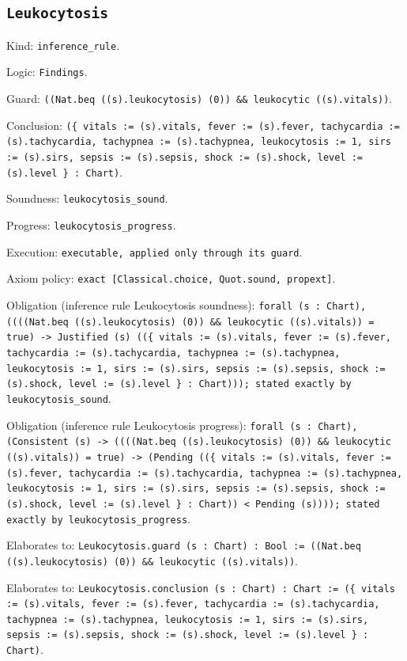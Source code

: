 \documentclass[11pt]{article}
\begin{document}
\subsection*{\texttt{Leukocytosis}}
\noindent Kind: \texttt{inference_rule}.\par
\noindent Logic: \texttt{Findings}.\par
\noindent Guard: \texttt{((Nat.beq ((s).leukocytosis) (0)) \&\& leukocytic ((s).vitals))}.\par
\noindent Conclusion: \texttt{(\{ vitals := (s).vitals, fever := (s).fever, tachycardia := (s).tachycardia, tachypnea := (s).tachypnea, leukocytosis := 1, sirs := (s).sirs, sepsis := (s).sepsis, shock := (s).shock, level := (s).level \} : Chart)}.\par
\noindent Soundness: \texttt{leukocytosis\_sound}.\par
\noindent Progress: \texttt{leukocytosis\_progress}.\par
\noindent Execution: \texttt{executable, applied only through its guard}.\par
\noindent Axiom policy: \texttt{exact [Classical.choice, Quot.sound, propext]}.\par
\noindent Obligation (inference rule Leukocytosis soundness): \texttt{forall (s : Chart), ((((Nat.beq ((s).leukocytosis) (0)) \&\& leukocytic ((s).vitals)) = true) -> Justified (s) ((\{ vitals := (s).vitals, fever := (s).fever, tachycardia := (s).tachycardia, tachypnea := (s).tachypnea, leukocytosis := 1, sirs := (s).sirs, sepsis := (s).sepsis, shock := (s).shock, level := (s).level \} : Chart))); stated exactly by leukocytosis\_sound}.\par
\noindent Obligation (inference rule Leukocytosis progress): \texttt{forall (s : Chart), (Consistent (s) -> ((((Nat.beq ((s).leukocytosis) (0)) \&\& leukocytic ((s).vitals)) = true) -> (Pending ((\{ vitals := (s).vitals, fever := (s).fever, tachycardia := (s).tachycardia, tachypnea := (s).tachypnea, leukocytosis := 1, sirs := (s).sirs, sepsis := (s).sepsis, shock := (s).shock, level := (s).level \} : Chart)) < Pending (s)))); stated exactly by leukocytosis\_progress}.\par
\noindent Elaborates to: \texttt{Leukocytosis.guard (s : Chart) : Bool := ((Nat.beq ((s).leukocytosis) (0)) \&\& leukocytic ((s).vitals))}.\par
\noindent Elaborates to: \texttt{Leukocytosis.conclusion (s : Chart) : Chart := (\{ vitals := (s).vitals, fever := (s).fever, tachycardia := (s).tachycardia, tachypnea := (s).tachypnea, leukocytosis := 1, sirs := (s).sirs, sepsis := (s).sepsis, shock := (s).shock, level := (s).level \} : Chart)}.\par
\end{document}
